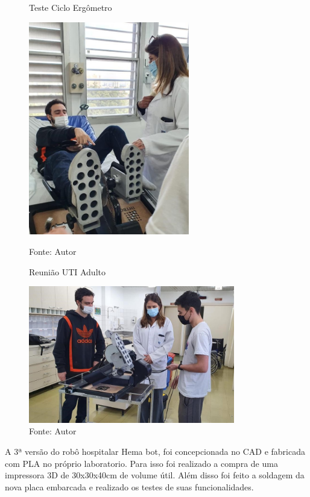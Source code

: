 \documentclass[]{politex}
\begin{document}
\begin{figure}[h]
\centering
    \begin{minipage}{0.5\textwidth}
       \centering
        \caption{Teste Ciclo Ergômetro}
        \centering %
        \includegraphics[width=7cm]{images/teste_ciclo.jpeg}
        \caption*{Fonte: Autor}
        \label{figura: Teste Ciclo Ergômetro}
        
    \end{minipage}\hfill
    \begin{minipage}{0.5\textwidth}
        \centering
        \caption{Reunião UTI Adulto}
        \centering %
        \includegraphics[width=9cm]{images/reuni_ciclo.jpeg}
        \caption*{Fonte: Autor}
        \label{figura: Reunião UTI Adulto}
    \end{minipage}\hfill
\end{figure}


A 3ª versão do robô hospitalar Hema bot, foi concepcionada no CAD e fabricada com PLA no próprio laboratorio. Para isso foi realizado a compra de uma impressora 3D de 30x30x40cm de volume útil. Além disso foi feito a soldagem da nova placa embarcada e realizado os testes de suas funcionalidades.
\end{document}
